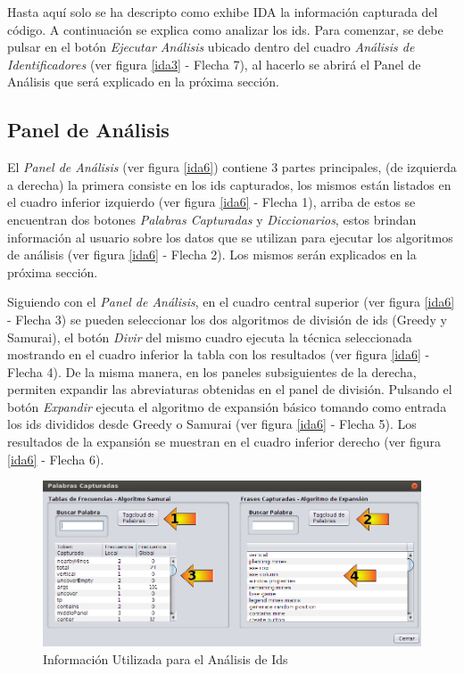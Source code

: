 \documentclass[a4paper,12pt]{report}
\begin{document}
Hasta aquí solo se ha descripto como exhibe IDA la información capturada del código. A continuación se explica como analizar los ids. Para comenzar, se debe pulsar en el botón \textit{Ejecutar Análisis} ubicado dentro del cuadro \textit{Análisis de Identificadores} (ver figura \ref{ida3} - Flecha 7), al hacerlo se abrirá el Panel de Análisis que será explicado en la próxima sección.

\subsection{Panel de Análisis}

El \textit{Panel de Análisis} (ver figura \ref{ida6}) contiene 3 partes principales, (de izquierda a derecha) la primera consiste en los ids capturados, los mismos están listados en el cuadro inferior izquierdo (ver figura \ref{ida6} - Flecha 1), arriba de estos se encuentran dos botones \textit{Palabras Capturadas} y \textit{Diccionarios}, estos brindan información al usuario sobre los datos que se utilizan para ejecutar los algoritmos de análisis (ver figura \ref{ida6} - Flecha 2). Los mismos serán explicados en la próxima sección.

Siguiendo con el \textit{Panel de Análisis}, en el cuadro central superior (ver figura \ref{ida6} - Flecha 3) se pueden seleccionar los dos algoritmos de división de ids (Greedy y Samurai), el botón \textit{Divir} del mismo cuadro ejecuta la técnica seleccionada mostrando en el cuadro inferior la tabla con los resultados (ver figura \ref{ida6} - Flecha 4). De la misma manera, en los paneles subsiguientes de la derecha, permiten expandir las abreviaturas obtenidas en el panel de división. Pulsando el botón \textit{Expandir} ejecuta el algoritmo de expansión básico tomando como entrada los ids divididos desde Greedy o Samurai (ver figura \ref{ida6} - Flecha 5). Los resultados de la expansión se muestran en el cuadro inferior derecho (ver figura \ref{ida6} - Flecha 6).

\begin{figure}[t] %
\centerline{%
\includegraphics[scale= 0.55]{./ida_07.png}
}
\caption{Información Utilizada para el Análisis de Ids}
\label{ida7}
\end{figure}
\end{document}
